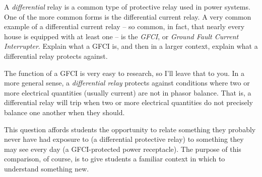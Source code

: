 

A {\it differential} relay is a common type of protective relay used in power systems.  One of the more common forms is the differential current relay.  A very common example of a differential current relay -- so common, in fact, that nearly every house is equipped with at least one -- is the {\it GFCI}, or {\it Ground Fault Current Interrupter}.  Explain what a GFCI is, and then in a larger context, explain what a differential relay protects against.







The function of a GFCI is very easy to research, so I'll leave that to you.  In a more general sense, a {\it differential relay} protects against conditions where two or more electrical quantities (usually current) are not in phasor balance.  That is, a differential relay will trip when two or more electrical quantities do not precisely balance one another when they should.







This question affords students the opportunity to relate something they probably never have had exposure to (a differential protective relay) to something they may see every day (a GFCI-protected power receptacle).  The purpose of this comparison, of course, is to give students a familiar context in which to understand something new.





